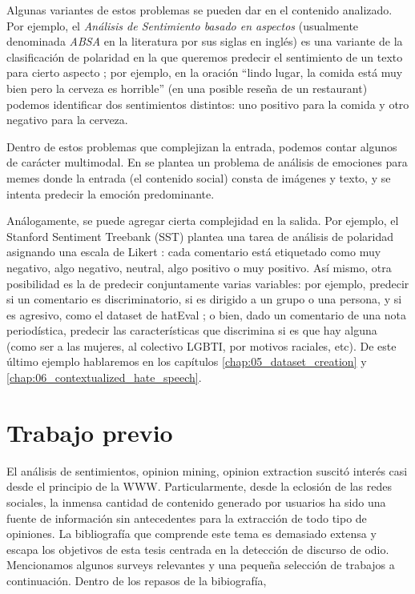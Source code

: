 Algunas variantes de estos problemas se pueden dar en el contenido analizado. Por ejemplo, el \emph{Análisis de Sentimiento basado en aspectos} (usualmente denominada \emph{ABSA} en la literatura por sus siglas en inglés) es una variante de la clasificación de polaridad en la que queremos predecir el sentimiento de un texto para cierto aspecto \cite{pavlopoulos2014aspect}; por ejemplo, en la oración ``lindo lugar, la comida está muy bien pero la cerveza es horrible'' (en una posible reseña de un restaurant) podemos identificar dos sentimientos distintos: uno positivo para la comida y otro negativo para la cerveza.

Dentro de estos problemas que complejizan la entrada, podemos contar algunos de carácter multimodal.  En \citet{sharma-etal-2020-semeval} se plantea un problema de análisis de emociones para memes donde la entrada (el contenido social) consta de imágenes y texto, y se intenta predecir la emoción predominante.

Análogamente, se puede agregar cierta complejidad en la salida. Por ejemplo, el Stanford Sentiment Treebank (SST) \cite{socher-etal-2013-recursive} plantea una tarea de análisis de polaridad asignando una escala de Likert \cite{likert1932technique}: cada comentario está etiquetado como muy negativo, algo negativo, neutral, algo positivo o muy positivo. Así mismo, otra posibilidad es la de predecir conjuntamente varias variables: por ejemplo, predecir si un comentario es discriminatorio, si es dirigido a un grupo o una persona, y si es agresivo, como el dataset de hatEval \cite{hateval2019semeval}; o bien, dado un comentario de una nota periodística, predecir las características que discrimina si es que hay alguna (como ser a las mujeres, al colectivo LGBTI, por motivos raciales, etc). De este último ejemplo hablaremos en los capítulos \ref{chap:05_dataset_creation} y \ref{chap:06_contextualized_hate_speech}.


\section{Trabajo previo}

El análisis de sentimientos, opinion mining, opinion extraction suscitó interés casi desde el principio de la WWW. Particularmente, desde la eclosión de las redes sociales, la inmensa cantidad de contenido generado por usuarios ha sido una fuente de información sin antecedentes para la extracción de todo tipo de opiniones. La bibliografía que comprende este tema es demasiado extensa y escapa los objetivos de esta tesis centrada en la detección de discurso de odio. Mencionamos algunos surveys relevantes y una pequeña selección de trabajos a continuación. Dentro de los repasos de la bibiografía,

